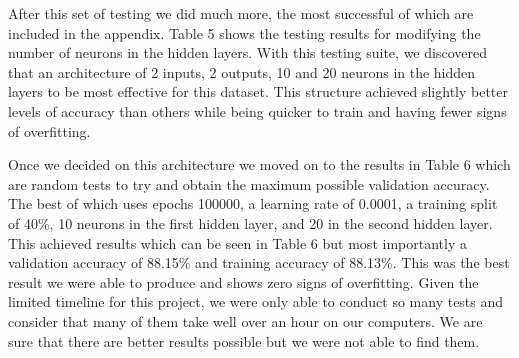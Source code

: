\documentclass[12pt]{article}
\begin{document}
\begin{table}[h]
\centering
\caption{Sensitivity Analysis IV \newline{} Parameters of , , }
\end{table}

After this set of testing we did much more, the most successful of which are included in the appendix. Table 5 shows the testing results for modifying the number of neurons in the hidden layers. With this testing suite, we discovered that an architecture of 2 inputs, 2 outputs, 10 and 20 neurons in the hidden layers to be most effective for this dataset. This structure achieved slightly better levels of accuracy than others while being quicker to train and having fewer signs of overfitting.

Once we decided on this architecture we moved on to the results in Table 6 which are random tests to try and obtain the maximum possible validation accuracy. The best of which uses epochs 100000, a learning rate of 0.0001, a training split of 40\%, 10 neurons in the first hidden layer, and 20 in the second hidden layer. This achieved results which can be seen in Table 6 but most importantly a validation accuracy of 88.15\% and training accuracy of 88.13\%. This was the best result we were able to produce and shows zero signs of overfitting. Given the limited timeline for this project, we were only able to conduct so many tests and consider that many of them take well over an hour on our computers. We are sure that there are better results possible but we were not able to find them.
\end{document}
